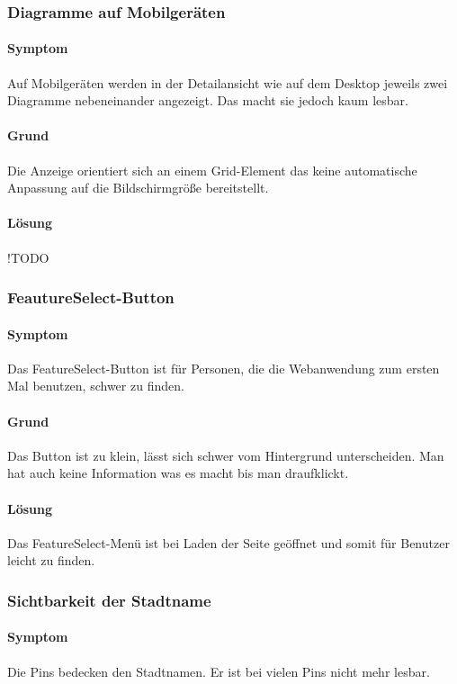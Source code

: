 \subsubsection{Diagramme auf Mobilgeräten}
\paragraph{Symptom}
Auf Mobilgeräten werden in der Detailansicht wie auf dem Desktop jeweils zwei Diagramme nebeneinander angezeigt.
Das macht sie jedoch kaum lesbar.

\paragraph{Grund}
Die Anzeige orientiert sich an einem Grid-Element das keine automatische Anpassung auf 
die Bildschirmgröße bereitstellt.

\paragraph{Lösung}
!TODO

\subsubsection{FeautureSelect-Button}
\paragraph{Symptom}
Das FeatureSelect-Button ist für Personen, die die Webanwendung zum ersten Mal benutzen, schwer zu finden.  

\paragraph{Grund}
Das Button ist zu klein, lässt sich schwer vom Hintergrund unterscheiden. Man hat auch keine Information was es macht bis man draufklickt.

\paragraph{Lösung}
Das FeatureSelect-Menü ist bei Laden der Seite geöffnet und somit für Benutzer leicht zu finden.

\subsubsection{Sichtbarkeit der Stadtname}
\paragraph{Symptom}
Die Pins bedecken den Stadtnamen. Er ist bei vielen Pins nicht mehr lesbar.

